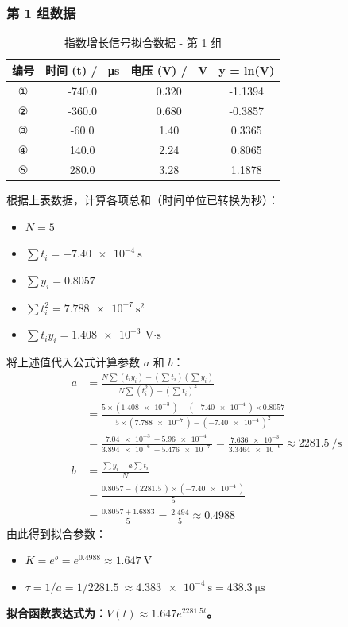 \documentclass{ctexart}
\begin{document}
\subsubsection{第 1 组数据}
\begin{table}[htbp]
    \centering
    \caption{指数增长信号拟合数据 - 第 1 组}
    \label{tab:growth1}
    \begin{tabular}{cccc}
        \toprule
        \textbf{编号} & \textbf{时间 (t) / \SI{}{\micro\second}} & \textbf{电压 (V) / \SI{}{\volt}} & \textbf{y = ln(V)} \\
        \midrule
        ① & -740.0 & 0.320 & -1.1394 \\
        ② & -360.0 & 0.680 & -0.3857 \\
        ③ & -60.0  & 1.40  & 0.3365  \\
        ④ & 140.0  & 2.24  & 0.8065  \\
        ⑤ & 280.0  & 3.28  & 1.1878  \\
        \bottomrule
    \end{tabular}
\end{table}
根据上表数据，计算各项总和（时间单位已转换为秒）：
\begin{itemize}
    \item $N = 5$
    \item $\sum t_i = \SI{-7.40e-4}{\second}$
    \item $\sum y_i = 0.8057$
    \item $\sum t_i^2 = \SI{7.788e-7}{\second\squared}$
    \item $\sum t_i y_i = \SI{1.408e-3}{\volt\cdot\second}$
\end{itemize}
将上述值代入公式计算参数 $a$ 和 $b$：
\begin{align*}
    a &= \frac{N \sum(t_i y_i) - (\sum t_i)(\sum y_i)}{N \sum(t_i^2) - (\sum t_i)^2} \\
      &= \frac{5 \times (\SI{1.408e-3}{}) - (\SI{-7.40e-4}{}) \times 0.8057}{5 \times (\SI{7.788e-7}{}) - (\SI{-7.40e-4}{})^2} \\
      &= \frac{\SI{7.04e-3}{} + \SI{5.96e-4}{}}{\SI{3.894e-6}{} - \SI{5.476e-7}{}} = \frac{\SI{7.636e-3}{}}{\SI{3.3464e-6}{}} \approx \SI{2281.5}{\per\second} \\
    \\
    b &= \frac{\sum y_i - a \sum t_i}{N} \\
      &= \frac{0.8057 - (\SI{2281.5}{}) \times (\SI{-7.40e-4}{})}{5} \\
      &= \frac{0.8057 + 1.6883}{5} = \frac{2.494}{5} \approx 0.4988
\end{align*}
由此得到拟合参数：
\begin{itemize}
    \item $K = e^b = e^{0.4988} \approx \SI{1.647}{\volt}$
    \item $\tau = 1/a = 1 / \SI{2281.5}{} \approx \SI{4.383e-4}{\second} = \SI{438.3}{\micro\second}$
\end{itemize}
\textbf{拟合函数表达式为：$V(t) \approx 1.647 e^{2281.5 t}$。}
\end{document}
